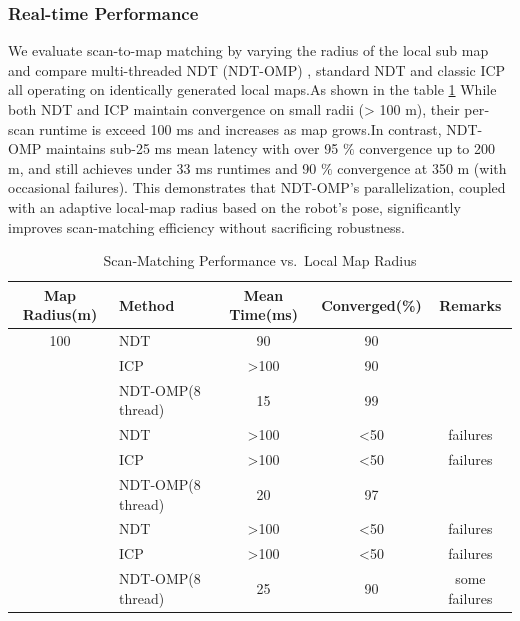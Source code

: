 \subsubsection{Real-time Performance }

We evaluate  scan-to-map matching by varying the radius of the local sub map and compare multi-threaded
NDT (NDT-OMP) , standard NDT and classic ICP all operating on identically generated local maps.As shown in the table \ref{tab:scanmap_radius} While both NDT and ICP maintain convergence on small radii (> 100 m), their per‐scan runtime  is exceed 100 ms and increases as map grows.In contrast, NDT-OMP maintains sub-25 ms mean latency with over 95 $\%$ convergence up to 200 m, and still achieves under 33 ms runtimes and 90 $\%$ convergence at 350 m (with occasional failures). This demonstrates that NDT-OMP’s parallelization, coupled with an adaptive local-map radius based on the robot’s pose, significantly improves scan-matching efficiency without sacrificing robustness.



\begin{table}[H]
	\centering
	\caption{Scan‐Matching Performance vs.\ Local Map Radius}
	\renewcommand{\arraystretch}{0.5}
	\setlength{\tabcolsep}{1pt}
	\label{tab:scanmap_radius}
	\begin{tabular}{c l c c c}
		\toprule
		\textbf{Map Radius(m)} & \textbf{Method} & \textbf{Mean Time(ms)} & \textbf{Converged(\%)} & \textbf{Remarks} \\
		\midrule
		100 & NDT     & 90  & 90 &  \\
		& ICP     & >100  & 90 &             \\
		& NDT‐OMP(8 thread) &  15  & 99 &     \\
			\midrule
		\addlinespace
		200 & NDT     & >100  & <50 &  failures           \\
		& ICP     & >100  & <50&       failures     \\
		& NDT‐OMP(8 thread) & 20  & 97 &            \\
			\midrule
		\addlinespace
		350 & NDT     & >100  & <50 &  failures \\
		& ICP     & >100 &     <50 &  failures          \\
		& NDT‐OMP(8 thread) & 25  & 90 &  some failures     \\
		\bottomrule
	\end{tabular}
\end{table}

